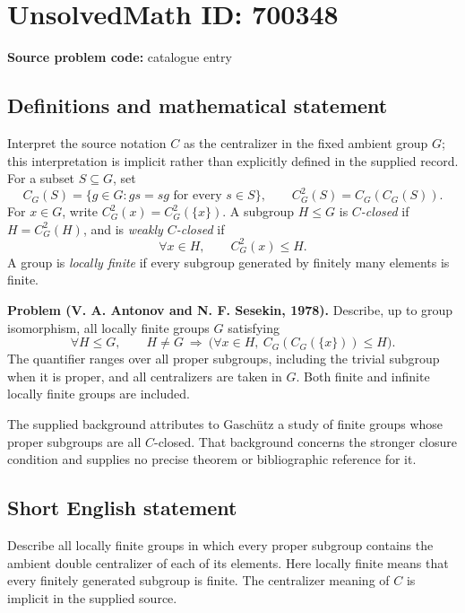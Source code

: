 \documentclass[11pt]{article}
\begin{document}
\section*{UnsolvedMath ID: 700348}
\textbf{Source problem code:} catalogue entry
\subsection{Definitions and mathematical statement}
Interpret the source notation \(C\) as the centralizer in the fixed ambient group \(G\); this interpretation is implicit rather than explicitly defined in the supplied record. For a subset \(S\subseteq G\), set
\[
C_G(S)=\{g\in G:gs=sg\text{ for every }s\in S\},\qquad C_G^2(S)=C_G(C_G(S)).
\]
For \(x\in G\), write \(C_G^2(x)=C_G^2(\{x\})\). A subgroup \(H\leq G\) is \emph{\(C\)-closed} if \(H=C_G^2(H)\), and is \emph{weakly \(C\)-closed} if
\[
\forall x\in H,\qquad C_G^2(x)\leq H.
\]
A group is \emph{locally finite} if every subgroup generated by finitely many elements is finite.

\textbf{Problem (V. A. Antonov and N. F. Sesekin, 1978).} Describe, up to group isomorphism, all locally finite groups \(G\) satisfying
\[
\forall H\leq G,\qquad H\neq G\ \Longrightarrow\ \bigl(\forall x\in H,\ C_G(C_G(\{x\}))\leq H\bigr).
\]
The quantifier ranges over all proper subgroups, including the trivial subgroup when it is proper, and all centralizers are taken in \(G\). Both finite and infinite locally finite groups are included.

The supplied background attributes to Gasch\"utz a study of finite groups whose proper subgroups are all \(C\)-closed. That background concerns the stronger closure condition and supplies no precise theorem or bibliographic reference for it.
\subsection{Short English statement}
Describe all locally finite groups in which every proper subgroup contains the ambient double centralizer of each of its elements. Here locally finite means that every finitely generated subgroup is finite. The centralizer meaning of \(C\) is implicit in the supplied source.
\end{document}
